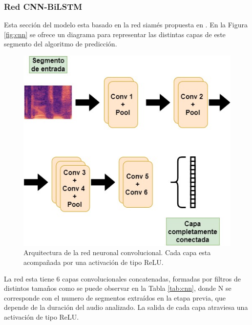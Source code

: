 \subsubsection{Red CNN-BiLSTM}
Esta sección del modelo esta basado en la red siamés propuesta en \cite{qualityEst}. En la Figura \eqref{fig:cnn} se ofrece un diagrama para representar las distintas capas de este segmento del algoritmo de predicción. 

\begin{figure}[h]
    \centering
    \includegraphics[scale=.45]{imagenes/cnn.jpg}
    \caption{ Arquitectura de la red neuronal convolucional. Cada capa esta acompañada por una activación de tipo ReLU.}
    \label{fig:cnn}
\end{figure}




La red esta tiene 6 capas convolucionales concatenadas, formadas por filtros de distintos tamaños como se puede observar en la Tabla \ref{tab:cnn}, donde N se corresponde con el numero de segmentos extraídos en la etapa previa, que depende de la duración del audio analizado. La salida de cada capa atraviesa una activación de tipo ReLU.

